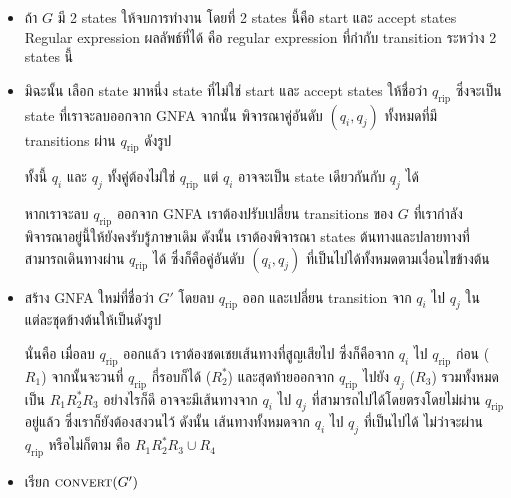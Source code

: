 \begin{itemize}
\item ถ้า $G$ มี 2 states ให้จบการทำงาน โดยที่ 2 states นี้คือ start และ accept states \enskip Regular expression ผลลัพธ์ที่ได้ คือ regular expression ที่กำกับ transition ระหว่าง 2 states นี้

\item มิฉะนั้น เลือก state มาหนึ่ง state ที่ไม่ใช่ start และ accept states ให้ชื่อว่า $q_\mathup{rip}$ ซึ่งจะเป็น state ที่เราจะลบออกจาก GNFA \enskip จากนั้น พิจารณาคู่อันดับ $(q_i,q_j)$ ทั้งหมดที่มี transitions ผ่าน $q_\mathup{rip}$ ดังรูป
\begin{center}
\end{center}
ทั้งนี้ $q_i$ และ $q_j$ ทั้งคู่ต้องไม่ใช่ $q_\mathup{rip}$ แต่ $q_i$ อาจจะเป็น state เดียวกันกับ $q_j$ ได้

หากเราจะลบ $q_\mathup{rip}$ ออกจาก GNFA เราต้องปรับเปลี่ยน transitions ของ $G$ ที่เรากำลังพิจารณาอยู่นี้ให้ยังคงรับรู้ภาษาเดิม ดังนั้น เราต้องพิจารณา states ต้นทางและปลายทางที่สามารถเดินทางผ่าน $q_\mathup{rip}$ ได้ ซึ่งก็คือคู่อันดับ $(q_i,q_j)$ ที่เป็นไปได้ทั้งหมดตามเงื่อนไขข้างต้น

\item สร้าง GNFA ใหม่ที่ชื่อว่า $G'$ โดยลบ $q_\mathup{rip}$ ออก และเปลี่ยน transition จาก $q_i$ ไป $q_j$ ในแต่ละชุดข้างต้นให้เป็นดังรูป
\begin{center}
\end{center}
นั่นคือ เมื่อลบ $q_\mathup{rip}$ ออกแล้ว เราต้องชดเชยเส้นทางที่สูญเสียไป ซึ่งก็คือจาก $q_i$ ไป $q_\mathup{rip}$ ก่อน ($R_1$) จากนั้นจะวนที่ $q_\mathup{rip}$ กี่รอบก็ได้ ($R_2^*$) และสุดท้ายออกจาก $q_\mathup{rip}$ ไปยัง $q_j$ ($R_3$) รวมทั้งหมดเป็น $R_1R_2^*R_3$ \enskip อย่างไรก็ดี อาจจะมีเส้นทางจาก $q_i$ ไป $q_j$ ที่สามารถไปได้โดยตรงโดยไม่ผ่าน $q_\mathup{rip}$ อยู่แล้ว ซึ่งเราก็ยังต้องสงวนไว้ \enskip ดังนั้น เส้นทางทั้งหมดจาก $q_i$ ไป $q_j$ ที่เป็นไปได้ ไม่ว่าจะผ่าน $q_\mathup{rip}$ หรือไม่ก็ตาม คือ $R_1R_2^*R_3\cup R_4$

\item เรียก $\textsc{convert}(G')$
\end{itemize}

